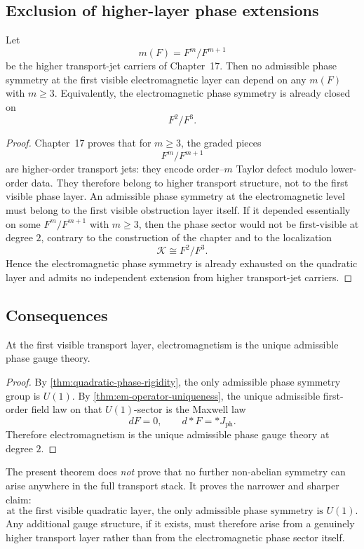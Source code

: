 \subsection{Exclusion of higher-layer phase extensions}
\begin{theorem}
	Let
	\[
		m(F)=F^m/F^{m+1}
	\]
	be the higher transport-jet carriers of Chapter~17.
	Then no admissible phase symmetry at the first visible electromagnetic
	layer can depend on any \(m(F)\) with \(m\ge 3\).
	Equivalently, the electromagnetic phase symmetry is already closed on
	\[
		F^2/F^3.
	\]
\end{theorem}
\begin{proof}
	Chapter~17 proves that for \(m\ge 3\), the graded pieces
	\[
		F^m/F^{m+1}
	\]
	are higher-order transport jets: they encode order--\(m\) Taylor defect
	modulo lower-order data.
	They therefore belong to higher transport structure, not to the first
	visible phase layer.
	An admissible phase symmetry at the electromagnetic level must belong to
	the first visible obstruction layer itself.
	If it depended essentially on some \(F^m/F^{m+1}\) with \(m\ge 3\), then
	the phase sector would not be first-visible at degree \(2\), contrary to
	the construction of the chapter and to the localization
	\[
		\mathcal K\cong F^2/F^3.
	\]
	Hence the electromagnetic phase symmetry is already exhausted on the
	quadratic layer and admits no independent extension from higher
	transport-jet carriers.
\end{proof}
\subsection{Consequences}
\begin{corollary}
	At the first visible transport layer, electromagnetism is the unique
	admissible phase gauge theory.
\end{corollary}
\begin{proof}
	By \cref{thm:quadratic-phase-rigidity}, the only admissible phase
	symmetry group is \(U(1)\).
	By \cref{thm:em-operator-uniqueness}, the
	unique admissible first-order field law on that \(U(1)\)-sector is the
	Maxwell law
	\[
		dF=0,\qquad d{*}F={*}J_{\mathrm{ph}}.
	\]
	Therefore electromagnetism is the unique admissible phase gauge theory at
	degree \(2\).
\end{proof}
\begin{remark}
	The present theorem does \emph{not} prove that no further non-abelian
	symmetry can arise anywhere in the full transport stack.
	It proves the narrower and sharper claim:
	\[
		\boxed{
			\text{at the first visible quadratic layer, the only admissible phase
				symmetry is }U(1).
		}
	\]
	Any additional gauge structure, if it exists, must therefore arise from
	a genuinely higher transport layer rather than from the electromagnetic
	phase sector itself.
\end{remark}

